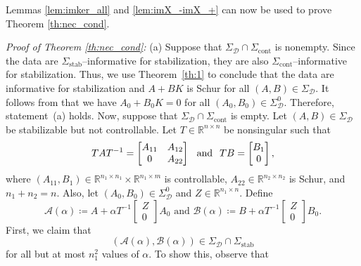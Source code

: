 \documentclass[9pt,shortpaper,twoside,web]{ieeecolor}
\begin{document}
Lemmas \ref{lem:imker_all} and \ref{lem:imX_-imX_+} can now be used to prove Theorem \ref{th:nec_cond}. 

\textit{Proof of Theorem \ref{th:nec_cond}:}
(a) Suppose that $\Sigma_\mathcal{D}\cap\Sigma_\text{cont}$ is nonempty. Since the data are \mbox{$\Sigma_\text{stab}$--informative} for stabilization, they are also $\Sigma_\text{cont}$--informative for stabilization. Thus, we use Theorem~\ref{th:1} to conclude that the data are informative for stabilization and $A+BK$ is Schur for all $(A,B)\in\Sigma_\mathcal{D}$. It follows from \cite[Lem. 15]{van2020data} that we have $A_0+B_0K=0$ for all $(A_0,B_0)\in\Sigma_\mathcal{D}^0$. Therefore, statement~(a) holds. Now, suppose that $\Sigma_\mathcal{D}\cap\Sigma_\text{cont}$ is empty. Let $(A,B)\in\Sigma_\mathcal{D}$ be stabilizable but not controllable. Let $T\in\mathbb{R}^{n\times n}$ be nonsingular such that
\begin{equation}
\label{eq:Kalman_decomp_T}
TAT^{-1}=\begin{bmatrix}
A_{11} & A_{12} \\
0      & A_{22}
\end{bmatrix} \hspace{0.25 cm} \text{and} \hspace{0.25 cm} TB=\begin{bmatrix}
B_1 \\ 0
\end{bmatrix},
\end{equation}
where $(A_{11},B_1)\!\in\!\mathbb{R}^{n_1\times n_1}\times \mathbb{R}^{n_1\times m}$ is controllable, $A_{22}\!\in\!\mathbb{R}^{n_2\times n_2}$ is Schur, and $n_1+n_2=n$. Also, let $(A_0,B_0)\!\in\!\Sigma_\mathcal{D}^0$ and $Z\!\in\!\mathbb{R}^{n_1\times n}$. Define
\begin{equation}
\mathcal{A}(\alpha)\coloneqq A+\alpha T^{-1}\begin{bmatrix}
Z\\0
\end{bmatrix}A_0\text{ and } 
\mathcal{B}(\alpha)\coloneqq B+\alpha T^{-1}\begin{bmatrix}
Z\\0
\end{bmatrix}B_0.
\end{equation}
First, we claim that
\begin{equation}
\label{eq:claim1}
\left(\mathcal{A}(\alpha),\mathcal{B}(\alpha)\right)\in\Sigma_\mathcal{D}\cap\Sigma_\text{stab}
\end{equation}
for all but at most $n_1^2$ values of $\alpha$. To show this, observe that 
\end{document}
